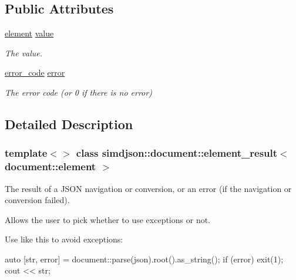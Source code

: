 \subsection*{Public Attributes}
\begin{DoxyCompactItemize}
\item 
\mbox{\label{classsimdjson_1_1document_1_1element__result_3_01document_1_1element_01_4_a6b0e623315737597dd1cbbbe36e18cd7}} 
\hyperlink{classsimdjson_1_1document_1_1element}{element} \hyperlink{classsimdjson_1_1document_1_1element__result_3_01document_1_1element_01_4_a6b0e623315737597dd1cbbbe36e18cd7}{value}
\begin{DoxyCompactList}\small\item\em The value. \end{DoxyCompactList}\item 
\mbox{\label{classsimdjson_1_1document_1_1element__result_3_01document_1_1element_01_4_a55568d4238187c5e1cb496aeff9e4e50}} 
\hyperlink{namespacesimdjson_a7b735a3a50ba79e3f7f14df5f77d8da9}{error\+\_\+code} \hyperlink{classsimdjson_1_1document_1_1element__result_3_01document_1_1element_01_4_a55568d4238187c5e1cb496aeff9e4e50}{error}
\begin{DoxyCompactList}\small\item\em The error code (or 0 if there is no error) \end{DoxyCompactList}\end{DoxyCompactItemize}


\subsection{Detailed Description}
\subsubsection*{template$<$$>$\newline
class simdjson\+::document\+::element\+\_\+result$<$ document\+::element $>$}

The result of a J\+S\+ON navigation or conversion, or an error (if the navigation or conversion failed). 

Allows the user to pick whether to use exceptions or not.

Use like this to avoid exceptions\+: \begin{DoxyVerb}auto [str, error] = document::parse(json).root().as_string();
if (error) { exit(1); }
cout << str;
\end{DoxyVerb}



